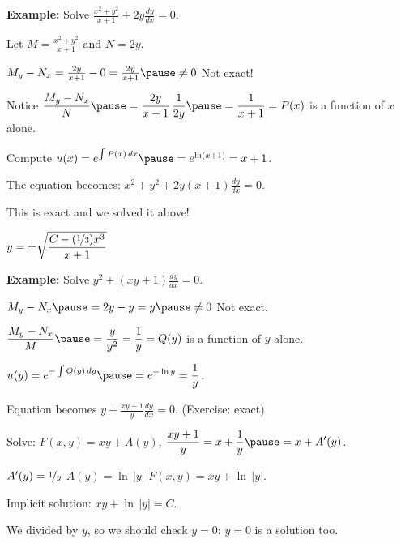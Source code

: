\documentclass[10pt,aspectratio=169]{beamer}
\begin{document}
\begin{frame}

\textbf{Example:}
Solve \quad
$\displaystyle
\frac{x^2+y^2}{x+1} + 2y \frac{dy}{dx} = 0$.

\medskip
\pause

Let $M= \frac{x^2+y^2}{x+1}$ and $N=2y$.

\medskip
\pause

$M_y-N_x = \frac{2y}{x+1} - 0 = \frac{2y}{x+1} \pause \not= 0$
\pause
\wthus
Not exact!

\medskip
\pause

Notice
\quad
$\displaystyle
\frac{M_y-N_x}{N}
\pause
= \frac{2y}{x+1} \, \frac{1}{2y}
\pause
= \frac{1}{x+1}
= P(x)
$
\quad
is a function of $x$ alone.

\medskip
\pause

Compute \quad
$u(x) = 
e^{\int  P(x) \, dx}
\pause
=
e^{\ln (x+1)} = x+1$.

\medskip
\pause

The equation becomes: \quad
$\displaystyle
x^2+y^2 + 2y(x+1) \frac{dy}{dx} = 0$.

\medskip
\pause

This is exact and we solved it above!

\medskip

$\displaystyle y = \pm \sqrt{\frac{C-(\nicefrac{1}{3})x^3}{x+1}}$
\end{frame}

\begin{frame}
\textbf{Example:}
Solve
$\displaystyle
y^2 + (xy+1) \frac{dy}{dx} = 0$.

\medskip
\pause

$M_y-N_x \pause = 2y-y = y \pause \not= 0$
\wthus
Not exact.

\medskip
\pause

$\displaystyle
\frac{M_y-N_x}{M} \pause = \frac{y}{y^2} = \frac{1}{y} =Q(y)$ 
\quad
is a function of $y$ alone.

\medskip
\pause

$\displaystyle
u(y)
= e^{-\int  Q(y) \, dy}
\pause
=
e^{-\ln y} = \frac{1}{y}$.

\medskip
\pause

Equation becomes
\quad
$\displaystyle y + \frac{xy+1}{y} \frac{dy}{dx} = 0$. \quad (Exercise: exact)

\medskip
\pause

Solve: \quad
$F(x,y) = xy + A(y)$,
\pause
\quad
$\displaystyle
\frac{xy+1}{y} = x+\frac{1}{y} \pause = x+ A'(y)$.

\medskip
\pause

$A'(y) = \nicefrac{1}{y}$
\pause
\wthus
$A(y) = \ln \, \lvert y \rvert$
\pause
\wthus
 $F(x,y) = xy + \ln \, \lvert y \rvert$.

\medskip
\pause

Implicit solution:
$xy + \ln \, \lvert y \rvert = C$.

\medskip
\pause

We divided by $y$, so we should check $y=0$:
\pause
\quad
$y=0$ is a solution too.
\end{frame}
\end{document}
